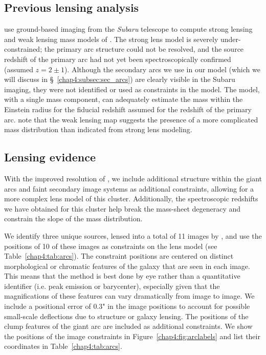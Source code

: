 \subsection{Previous lensing analysis}
\citet{Oguri:2012bs} use ground-based imaging from the {\it Subaru} telescope to compute strong lensing and weak lensing mass models of \cluster. The strong lens model is severely under-constrained; the primary arc structure could not be resolved, and the source redshift of the primary arc had not yet been spectroscopically confirmed (assumed $z=2\pm1$). Although the secondary arcs we use in our model (which we will discuss in \S~\ref{chap4:subsec:sec_arcs}) are clearly visible in the Subaru imaging, they were not identified or used as constraints in the model. The \citet{Oguri:2012bs} model, with a single mass component, can adequately estimate the mass within the Einstein radius for the fiducial redshift assumed for the redshift of the primary arc. \citet{Oguri:2012bs} note that the weak lensing map suggests the presence of a more complicated mass distribution than indicated from strong lens modeling.

\subsection{Lensing evidence}
With the improved resolution of \hst, we include additional structure within the giant arcs and faint secondary image systems as additional constraints, allowing for a more complex lens model of this cluster. Additionally, the spectroscopic redshifts we have obtained for this cluster help break the mass-sheet degeneracy \citep{Schneider:1995vn} and constrain the slope of the mass distribution.

We identify three unique sources, lensed into a total of 11 images by \cluster, and use the positions of 10 of these images as constraints on the lens model (see Table~\ref{chap4:tab:arcs}). The constraint positions are centered on distinct morphological or chromatic features of the galaxy that are seen in each image. This means that the method is best done by eye rather than a quantitative identifier (i.e. peak emission or barycenter), especially given that the magnifications of these features can vary dramatically from image to image. We include a positional error of 0.3" in the image positions to account for possible small-scale deflections due to structure or galaxy lensing. The positions of the clump features of the giant arc are included as additional constraints. We show the positions of the image constraints in Figure~\ref{chap4:fig:arclabels} and list their coordinates in Table~\ref{chap4:tab:arcs}. 

